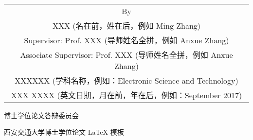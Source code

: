 \begin{titlepage}
\begin{center}
		\vspace{3cm}
		{\sanhao
			\begin{center} \renewcommand{\arraystretch}{1.5}
				\begin{tabular}{c}
					By \\
					XXX (名在前，姓在后，例如 Ming Zhang) \\
					Supervisor: Prof. XXX (导师姓名全拼，例如 Anxue Zhang) \\
					Associate Supervisor: Prof. XXX (导师姓名全拼，例如 Anxue Zhang) \\
					XXXXXX (学科名称，例如：Electronic Science and Technology) \\
					XXX XXXX (英文日期，月在前，年在后，例如：September 2017) \\
				\end{tabular} \renewcommand{\arraystretch}{1}
			\end{center} 
		}
	\end{center}
	\clearpage{\pagestyle{empty}\cleardoublepage}
	
	\newpage\thispagestyle{empty}
	\begin{center}
		\parbox[t][0.7cm][t]{\textwidth}{}
		
		\begin{center}{\hei 博士学位论文答辩委员会}\end{center}
		
		\vspace{1cm}
		\begin{center}{\hei 西安交通大学博士学位论文 \LaTeX{} 模板}\end{center}
		

\end{center}
\end{titlepage}
